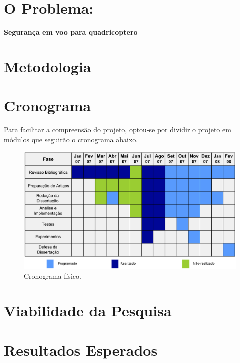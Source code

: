 \documentclass[a4paper, 12pt]{article}
\begin{document}
\newpage

\section{O Problema:}
\label{sec:prob}
\textbf{Segurança em voo para quadricoptero}

\newpage

\section{Metodologia}
\label{sec:meto}

\newpage

\section{Cronograma} 
\label{sec:crono}
Para facilitar a compreensão do projeto, optou-se por dividir o projeto em módulos que seguirão o cronograma abaixo.
\begin{figure}[h]
	\centering
		\includegraphics[scale=0.4]{img/cronograma.pdf}
	\caption{Cronograma físico.}
	\label{fig:cronograma}
\end{figure}

\newpage

\section{Viabilidade da Pesquisa}
\label{sec:viabilidade}

\newpage

\section{Resultados Esperados}
\label{sec:resultados}

\newpage
\end{document}
